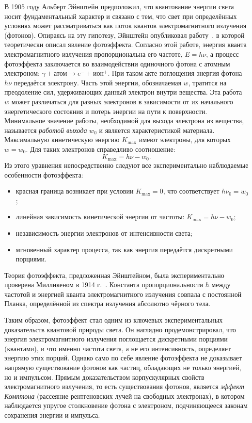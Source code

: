 \documentclass[a4paper, 12pt]{article}
\begin{document}
В 1905 году Альберт Эйнштейн предположил, что квантование
энергии света носит фундаментальный характер и связано с тем, что свет при определённых условиях может рассматриваться как поток квантов
электромагнитного излучения (фотонов). Опираясь на эту гипотезу,
Эйнштейн опубликовал работу~\cite{Einstein1905}, в которой теоретически описал явление фотоэффекта.
Согласно этой работе, энергия кванта электромагнитного излучения
пропорциональна его частоте, $E = h\nu$, а процесс фотоэффекта заключается во
взаимодействии одиночного фотона с атомным электроном:
$\gamma + \text{атом} \to e^- + \text{ион}^+$.
При таком акте поглощения энергия фотона $h\nu$ передаётся электрону. Часть этой
энергии, обозначаемая $w$, тратится на преодоление сил, удерживающих данный
электрон внутри вещества. Эта работа $w$ может различаться для разных электронов
в зависимости от их начального энергетического состояния и потерь энергии на
пути к поверхности. Минимальное значение работы, необходимой для выхода
электрона из вещества, называется \emph{работой выхода} $w_0$ и является
характеристикой материала. Максимальную кинетическую энергию $K_{\text{max}}$
имеют электроны, для которых $w = w_0$. Для таких электронов справедливо
соотношение:
\[
K_{\text{max}} = h\nu - w_0.
\]
Из этого уравнения непосредственно следуют все экспериментально наблюдаемые особенности фотоэффекта:
\begin{itemize}
\item красная граница возникает при условии $K_{\text{max}} = 0$, что соответствует $h\nu_0 = w_0$;
\item линейная зависимость кинетической энергии от частоты: $K_{\text{max}} = h\nu - w_0$;
\item независимость энергии электронов от интенсивности света;
\item мгновенный характер процесса, так как энергия передаётся дискретными порциями.
\end{itemize}

Теория фотоэффекта, предложенная Эйнштейном, была экспериментально проверена
Милликеном в 1914 г.~\cite{Millikan1914}. Константа пропорциональности $h$ между частотой и энергией
кванта электромагнитного излучения совпала с постоянной Планка, определённой из
спектра излучения абсолютно чёрного тела.

Таким образом, фотоэффект стал одним из ключевых экспериментальных доказательств
квантовой природы света. Он наглядно продемонстрировал, что энергия
электромагнитного излучения поглощается дискретными порциями (квантами), и что
именно частота света, а не его интенсивность, определяет энергию этих порций.
Однако само по себе явление фотоэффекта не доказывает напрямую существование
фотонов как частиц, обладающих не только энергией, но и импульсом. Прямым
доказательством корпускулярных свойств электромагнитного излучения, то есть
существования фотонов, является \emph{эффект Комптона} (рассеяние рентгеновских
лучей на свободных электронах), в котором наблюдается упругое столкновение фотона
с электроном, подчиняющееся законам сохранения энергии и импульса.
\end{document}
